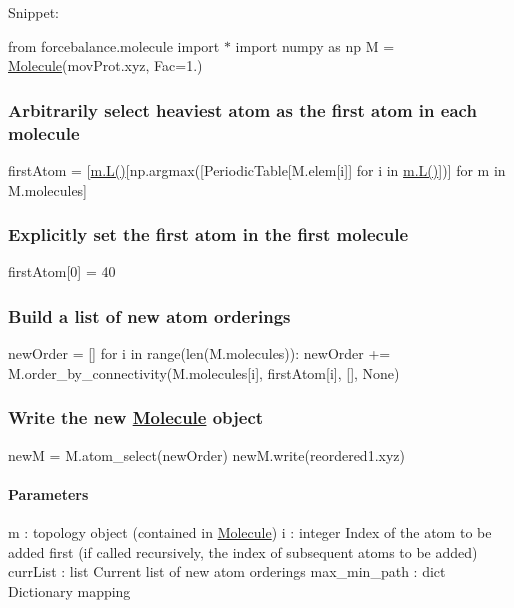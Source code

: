 Snippet\+:

from forcebalance.\+molecule import $\ast$ import numpy as np M = \hyperlink{classsrc_1_1molecule_1_1Molecule}{Molecule}(\textquotesingle{}mov\+Prot.\+xyz\textquotesingle{}, Fac=1.) \subsubsection*{Arbitrarily select heaviest atom as the first atom in each molecule}

first\+Atom = \mbox{[}\hyperlink{namespacesrc_1_1chemistry_ab523d2adfa843021628d784c390fb46f}{m.\+L()}\mbox{[}np.\+argmax(\mbox{[}Periodic\+Table\mbox{[}M.\+elem\mbox{[}i\mbox{]}\mbox{]} for i in \hyperlink{namespacesrc_1_1chemistry_ab523d2adfa843021628d784c390fb46f}{m.\+L()}\mbox{]})\mbox{]} for m in M.\+molecules\mbox{]} \subsubsection*{Explicitly set the first atom in the first molecule}

first\+Atom\mbox{[}0\mbox{]} = 40 \subsubsection*{Build a list of new atom orderings}

new\+Order = \mbox{[}\mbox{]} for i in range(len(M.\+molecules))\+: new\+Order += M.\+order\+\_\+by\+\_\+connectivity(M.\+molecules\mbox{[}i\mbox{]}, first\+Atom\mbox{[}i\mbox{]}, \mbox{[}\mbox{]}, None) \subsubsection*{Write the new \hyperlink{classsrc_1_1molecule_1_1Molecule}{Molecule} object}

newM = M.\+atom\+\_\+select(new\+Order) new\+M.\+write(\textquotesingle{}reordered1.\+xyz\textquotesingle{})

\paragraph*{Parameters }

m \+: topology object (contained in \hyperlink{classsrc_1_1molecule_1_1Molecule}{Molecule}) i \+: integer Index of the atom to be added first (if called recursively, the index of subsequent atoms to be added) curr\+List \+: list Current list of new atom orderings max\+\_\+min\+\_\+path \+: dict Dictionary mapping 

